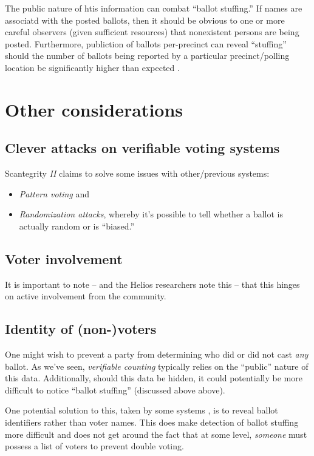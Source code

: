 \documentclass[10pt]{article}
\newcommand{\term}[1]{\textit{#1}}
\begin{document}
\begin{multicols}{2}
The public nature of htis information can combat ``ballot stuffing.'' If names are associatd with
the posted ballots, then it should be obvious to one or more careful observers (given sufficient
resources) that nonexistent persons are being posted. Furthermore, publiction of ballots
per-precinct can reveal ``stuffing'' should the number of ballots being reported by a particular
precinct/polling location be significantly higher than expected \cite{helios}.

\section{Other considerations}

\subsection{Clever attacks on verifiable voting systems}

Scantegrity \emph{II} claims to solve some issues with other/previous systems:
\begin{itemize}
	\item
		\term{Pattern voting} and
	\item
		\term{Randomization attacks}, whereby it's possible to tell whether a ballot is actually random
		or is ``biased.''
\end{itemize}

\subsection{Voter involvement}

It is important to note -- and the Helios researchers note this -- that this hinges on active
involvement from the community.

\subsection{Identity of (non-)voters}

One might wish to prevent a party from determining who did or did not cast \emph{any} ballot.
As we've seen, \term{verifiable counting} typically relies on the ``public'' nature of this data.
Additionally, should this data be hidden, it could potentially be more difficult to notice ``ballot
stuffing'' (discussed above above).

One potential solution to this, taken by some systems \cite{preta}, is to reveal ballot identifiers
rather than voter names. This does make detection of ballot stuffing more difficult and does not get
around the fact that at some level, \emph{someone} must possess a list of voters to prevent double
voting.


\end{multicols}
\end{document}
